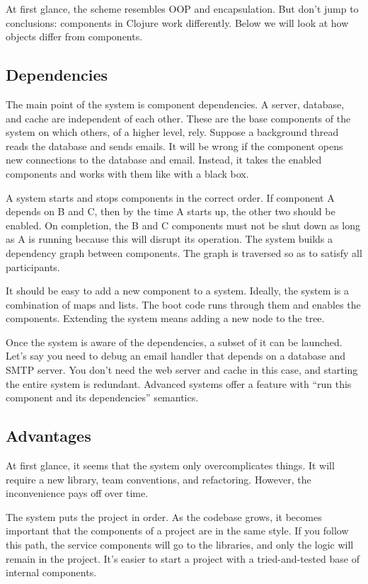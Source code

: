 
At first glance, the scheme resembles OOP and encapsulation. But don't jump to conclusions: components in Clojure work differently. Below we will look at how objects differ from components.

\subsection{Dependencies}

The main point of the system is component dependencies. A server, database, and cache are independent of each other. These are the base components of the system on which others, of a higher level, rely. Suppose a background thread reads the database and sends emails. It will be wrong if the component opens new connections to the database and email. Instead, it takes the enabled components and works with them like with a black box.

A system starts and stops components in the correct order. If component A depends on B and C, then by the time A starts up, the other two should be enabled. On completion, the B and C components must not be shut down as long as A is running because this will disrupt its operation. The system builds a dependency graph between components. The graph is traversed so as to satisfy all participants.

It should be easy to add a new component to a system. Ideally, the system is a combination of maps and lists.  The boot code runs through them and enables the components. Extending the system means adding a new node to the tree.

Once the system is aware of the dependencies, a subset of it can be launched. Let's say you need to debug an email handler that depends on a database and SMTP server. You don't need the web server and cache in this case, and starting the entire system is redundant. Advanced systems offer a feature with ``run this component and its dependencies'' semantics.

\subsection{Advantages}

At first glance, it seems that the system only overcomplicates things. It will require a new library, team conventions, and refactoring. However, the inconvenience pays off over time.

The system puts the project in order. As the codebase grows, it becomes important that the components of a project are in the same style. If you follow this path, the service components will go to the libraries, and only the logic will remain in the project. It's easier to start a project with a tried-and-tested base of internal components.

